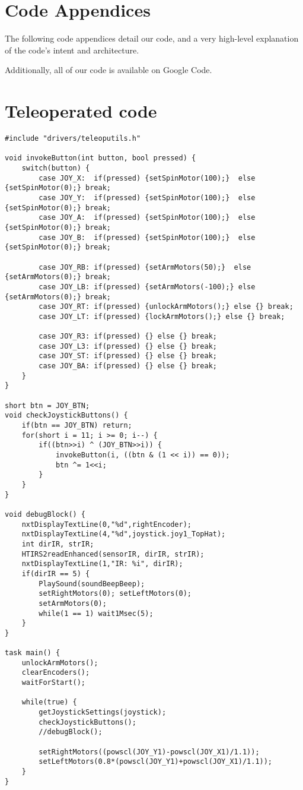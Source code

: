 \section{Code Appendices}
The following code appendices detail our code, and a very high-level explanation of the code's intent and architecture.

Additionally, all of our code is available on Google Code.

\section{Teleoperated code}
\begin{lstlisting}
#include "drivers/teleoputils.h"

void invokeButton(int button, bool pressed) {
	switch(button) {
		case JOY_X:  if(pressed) {setSpinMotor(100);}  else {setSpinMotor(0);} break;
		case JOY_Y:  if(pressed) {setSpinMotor(100);}  else {setSpinMotor(0);} break;
		case JOY_A:  if(pressed) {setSpinMotor(100);}  else {setSpinMotor(0);} break;
		case JOY_B:  if(pressed) {setSpinMotor(100);}  else {setSpinMotor(0);} break;

		case JOY_RB: if(pressed) {setArmMotors(50);}  else {setArmMotors(0);} break;
		case JOY_LB: if(pressed) {setArmMotors(-100);} else {setArmMotors(0);} break;
		case JOY_RT: if(pressed) {unlockArmMotors();} else {} break;
		case JOY_LT: if(pressed) {lockArmMotors();} else {} break;

		case JOY_R3: if(pressed) {} else {} break;
		case JOY_L3: if(pressed) {} else {} break;
		case JOY_ST: if(pressed) {} else {} break;
		case JOY_BA: if(pressed) {} else {} break;
	}
}

short btn = JOY_BTN;
void checkJoystickButtons() {
	if(btn == JOY_BTN) return;
	for(short i = 11; i >= 0; i--) {
		if((btn>>i) ^ (JOY_BTN>>i)) {
			invokeButton(i, ((btn & (1 << i)) == 0));
			btn ^= 1<<i;
		}
	}
}

void debugBlock() {
	nxtDisplayTextLine(0,"%d",rightEncoder);
	nxtDisplayTextLine(4,"%d",joystick.joy1_TopHat);
	int dirIR, strIR;
	HTIRS2readEnhanced(sensorIR, dirIR, strIR);
	nxtDisplayTextLine(1,"IR: %i", dirIR);
	if(dirIR == 5) {
		PlaySound(soundBeepBeep);
		setRightMotors(0); setLeftMotors(0);
		setArmMotors(0);
		while(1 == 1) wait1Msec(5);
	}
}

task main() {
	unlockArmMotors();
	clearEncoders();
 	waitForStart();

 	while(true) {
		getJoystickSettings(joystick);
		checkJoystickButtons();
		//debugBlock();

		setRightMotors((powscl(JOY_Y1)-powscl(JOY_X1)/1.1));
		setLeftMotors(0.8*(powscl(JOY_Y1)+powscl(JOY_X1)/1.1));
	}
}
\end{lstlisting}


